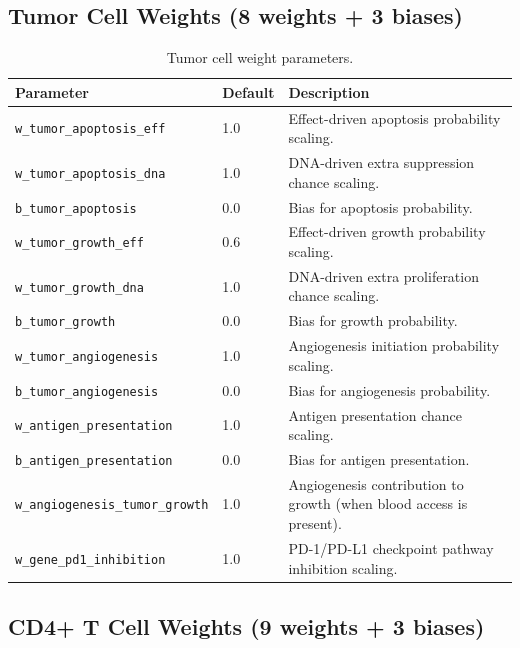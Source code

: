 \subsection{Tumor Cell Weights (8 weights + 3 biases)}

\begin{table}[H]
\centering
\caption{Tumor cell weight parameters.}
\label{tab:tumor-weights}
\begin{tabular}{@{}llp{5.5cm}@{}}
\toprule
\textbf{Parameter} & \textbf{Default} & \textbf{Description} \\
\midrule
\texttt{w\_tumor\_apoptosis\_eff} & 1.0 & Effect-driven apoptosis probability scaling. \\
\texttt{w\_tumor\_apoptosis\_dna} & 1.0 & DNA-driven extra suppression chance scaling. \\
\texttt{b\_tumor\_apoptosis} & 0.0 & Bias for apoptosis probability. \\
\texttt{w\_tumor\_growth\_eff} & 0.6 & Effect-driven growth probability scaling. \\
\texttt{w\_tumor\_growth\_dna} & 1.0 & DNA-driven extra proliferation chance scaling. \\
\texttt{b\_tumor\_growth} & 0.0 & Bias for growth probability. \\
\texttt{w\_tumor\_angiogenesis} & 1.0 & Angiogenesis initiation probability scaling. \\
\texttt{b\_tumor\_angiogenesis} & 0.0 & Bias for angiogenesis probability. \\
\texttt{w\_antigen\_presentation} & 1.0 & Antigen presentation chance scaling. \\
\texttt{b\_antigen\_presentation} & 0.0 & Bias for antigen presentation. \\
\texttt{w\_angiogenesis\_tumor\_growth} & 1.0 & Angiogenesis contribution to growth (when blood access is present). \\
\texttt{w\_gene\_pd1\_inhibition} & 1.0 & PD-1/PD-L1 checkpoint pathway inhibition scaling. \\
\bottomrule
\end{tabular}
\end{table}

\subsection{CD4+ T Cell Weights (9 weights + 3 biases)}

